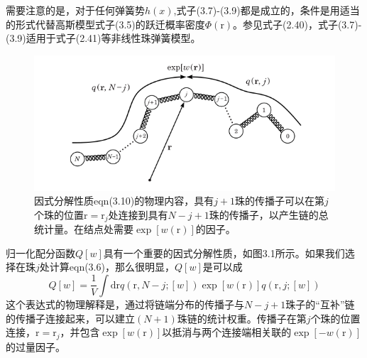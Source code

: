 需要注意的是，对于任何弹簧势$h(x)$,式子(3.7)-(3.9)都是成立的，条件是用适当的形式代替高斯模型式子(3.5)的跃迁概率密度$\Phi(\mathrm{r})$。参见式子(2.40)，式子(3.7)-(3.9)适用于式子(2.41)等非线性珠弹簧模型。
\begin{figure}[H]
\centering
\includegraphics[scale=0.7]{./figures/Figure_1.png}
\caption{因式分解性质eqn(3.10)的物理内容，具有$j+1$珠的传播子可以在第$j$个珠的位置$\mathrm{r}=\mathrm{r}_j$处连接到具有$N-j+1$珠的传播子，以产生链的总统计量。在结点处需要$\exp[w(\mathrm{r})]$的因子。}
\end{figure}
归一化配分函数$Q[w]$具有一个重要的因式分解性质，如图3.1所示。如果我们选择在珠$j$处计算eqn(3.6)，那么很明显，$Q[w]$是可以成
\begin{equation}
Q[w]=\frac{1}{V}\int\mathrm{d}\mathrm{r}q(\mathrm{r},N-j;[w])\exp[w(\mathrm{r})]q(\mathrm{r},j;[w])
\end{equation}
这个表达式的物理解释是，通过将链端分布的传播子与$N-j+1$珠子的“互补”链的传播子连接起来，可以建立$(N+1)$珠链的统计权重。传播子在第$j$个珠的位置连接，$\mathrm{r}=\mathrm{r}_j$，并包含$\exp[w(\mathrm{r})]$以抵消与两个连接端相关联的$\exp[-w(\mathrm{r})]$的过量因子。

